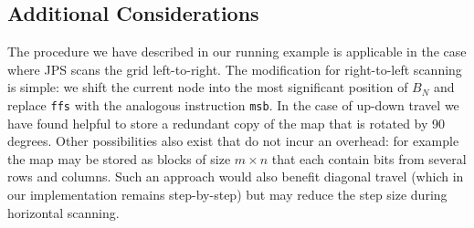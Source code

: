 \subsection*{Additional Considerations}
The procedure we have described in our running example is applicable in the case
where JPS scans the grid left-to-right. The modification for right-to-left
scanning is simple: we shift the current node into the most significant position
of $B_N$ and replace \texttt{ffs} with the analogous instruction \texttt{msb}.  In the case
of up-down travel we have found helpful to store a redundant copy of the
map that is rotated by 90 degrees. Other possibilities also exist that do not
incur an overhead: for example the map may be stored as blocks of size $m
\times n$ that each contain bits from several rows and columns. Such an
approach would also benefit diagonal travel (which in our implementation
remains step-by-step) but may reduce the step size during horizontal scanning.
%
%
%
%
%

